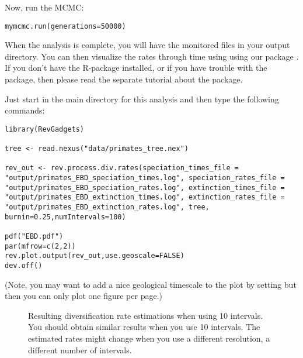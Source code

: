 Now, run the MCMC:
{\tt \begin{snugshade*}
\begin{lstlisting}
mymcmc.run(generations=50000)
\end{lstlisting}
\end{snugshade*}}

When the analysis is complete, you will have the monitored files in your output directory.
You can then visualize the rates through time using \R using our package \RevGadgets.
If you don't have the R-package \RevGadgets installed, or if you have trouble with the package, then please read the separate tutorial about the package.

Just start \R in the main directory for this analysis and then type the following commands:
{\tt \begin{snugshade*}
\begin{lstlisting}
library(RevGadgets)

tree <- read.nexus("data/primates_tree.nex")

rev_out <- rev.process.div.rates(speciation_times_file = "output/primates_EBD_speciation_times.log", speciation_rates_file = "output/primates_EBD_speciation_rates.log", extinction_times_file = "output/primates_EBD_extinction_times.log", extinction_rates_file = "output/primates_EBD_extinction_rates.log", tree, burnin=0.25,numIntervals=100)

pdf("EBD.pdf")
par(mfrow=c(2,2))
rev.plot.output(rev_out,use.geoscale=FALSE)
dev.off()
\end{lstlisting}
\end{snugshade*}}
(Note, you may want to add a nice geological timescale to the plot by setting  but then you can only plot one figure per page.)


\begin{figure}[h!]
\centering
{}
\caption{\small Resulting diversification rate estimations when using 10 intervals. You should obtain similar results when you use 10 intervals. The estimated rates might change when you use a different resolution, \IE a different number of intervals.}
\label{fig:EBD_Results}
\end{figure}


